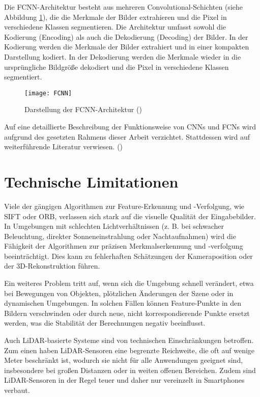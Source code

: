 Die FCNN-Architektur besteht aus mehreren Convolutional-Schichten (siehe Abbildung \ref{fig:FCNN}), die die Merkmale der Bilder extrahieren und die Pixel in verschiedene Klassen segmentieren. Die Architektur umfasst sowohl die Kodierung (Encoding) als auch die Dekodierung (Decoding) der Bilder. In der Kodierung werden die Merkmale der Bilder extrahiert und in einer kompakten Darstellung kodiert. In der Dekodierung werden die Merkmale wieder in die ursprüngliche Bildgröße dekodiert und die Pixel in verschiedene Klassen segmentiert.\cite{long2014fcnn}

\begin{figure}
    \centering
    \texttt{[image: FCNN]}
    \caption{Darstellung der FCNN-Architektur (\cite{long2014fcnn})\label{fig:FCNN}}\par
\end{figure}

Auf eine detaillierte Beschreibung der Funktionsweise von CNNs und FCNs wird aufgrund des gesetzten Rahmens dieser Arbeit verzichtet. Stattdessen wird auf weiterführende Literatur verwiesen. (\cite{long2014fcnn})

\section{Technische Limitationen}

Viele der gängigen Algorithmen zur Feature-Erkennung und -Verfolgung, wie SIFT oder ORB, verlassen sich stark auf die visuelle Qualität der Eingabebilder. In Umgebungen mit schlechten Lichtverhältnissen (z. B. bei schwacher Beleuchtung, direkter Sonneneinstrahlung oder Nachtaufnahmen) wird die Fähigkeit der Algorithmen zur präzisen Merkmalserkennung und -verfolgung beeinträchtigt. Dies kann zu fehlerhaften Schätzungen der Kameraposition oder der 3D-Rekonstruktion führen.

Ein weiteres Problem tritt auf, wenn sich die Umgebung schnell verändert, etwa bei Bewegungen von Objekten, plötzlichen Änderungen der Szene oder in dynamischen Umgebungen. In solchen Fällen können Feature-Punkte in den Bildern verschwinden oder durch neue, nicht korrespondierende Punkte ersetzt werden, was die Stabilität der Berechnungen negativ beeinflusst.

Auch LiDAR-basierte Systeme sind von technischen Einschränkungen betroffen. Zum einen haben LiDAR-Sensoren eine begrenzte Reichweite, die oft auf wenige Meter beschränkt ist, wodurch sie nicht für alle Anwendungen geeignet sind, insbesondere bei großen Distanzen oder in weiten offenen Bereichen. Zudem sind LiDAR-Sensoren in der Regel teuer und daher nur vereinzelt in Smartphones verbaut.